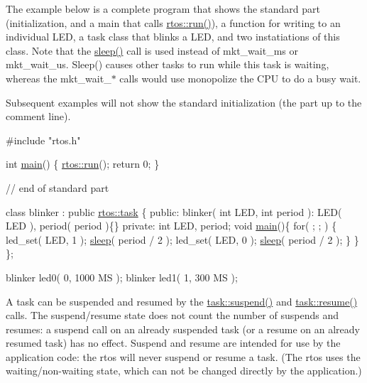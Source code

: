 The example below is a complete program that shows the standard part (initialization, and a main that calls \hyperlink{classrtos_a68de598a7ba3231db123f26187b31730}{rtos\+::run()}), a function for writing to an individual L\+ED, a task class that blinks a L\+ED, and two instatiations of this class. Note that the \hyperlink{classrtos_1_1task__base_a16101726a2ed9744face297f9373b632}{sleep()} call is used instead of mkt\+\_\+wait\+\_\+ms or mkt\+\_\+wait\+\_\+us. Sleep() causes other tasks to run while this task is waiting, whereas the mkt\+\_\+wait\+\_\+$\ast$ calls would use monopolize the C\+PU to do a busy wait.

Subsequent examples will not show the standard initialization (the part up to the comment line).


\begin{DoxyCode}
\textcolor{preprocessor}{#include "rtos.h"}

\textcolor{keywordtype}{int} \hyperlink{classrtos_1_1task__base_a67892c7e1f734e0a91baa5a4fc6dea27}{main}() \{
   \hyperlink{classrtos_a68de598a7ba3231db123f26187b31730}{rtos::run}();
   \textcolor{keywordflow}{return} 0;
\}

\textcolor{comment}{// end of standard part}

\textcolor{keyword}{class }blinker : \textcolor{keyword}{public} \hyperlink{classrtos_1_1task}{rtos::task} \{
\textcolor{keyword}{public}:
   blinker( \textcolor{keywordtype}{int} LED, \textcolor{keywordtype}{int} period ):
      LED( LED ), period( period )\{\}
\textcolor{keyword}{private}:
   \textcolor{keywordtype}{int} LED, period;
   \textcolor{keywordtype}{void} \hyperlink{classrtos_1_1task__base_a67892c7e1f734e0a91baa5a4fc6dea27}{main}()\{
      \textcolor{keywordflow}{for}( ; ; ) \{
         led\_set( LED, 1 );
         \hyperlink{classrtos_1_1task__base_a16101726a2ed9744face297f9373b632}{sleep}( period / 2 );
         led\_set( LED, 0 );
         \hyperlink{classrtos_1_1task__base_a16101726a2ed9744face297f9373b632}{sleep}( period / 2 );
      \}
   \}
\};

blinker led0( 0, 1000 MS );
blinker led1( 1,  300 MS );
\end{DoxyCode}


A task can be suspended and resumed by the \hyperlink{classrtos_1_1task__base_a23f6f33e6e2f3dbe35583c4eb2efe5f8}{task\+::suspend()} and \hyperlink{classrtos_1_1task__base_a3df0d70b06874044937c1ee59820c282}{task\+::resume()} calls. The suspend/resume state does not count the number of suspends and resumes\+: a suspend call on an already suspended task (or a resume on an already resumed task) has no effect. Suspend and resume are intended for use by the application code\+: the rtos will never suspend or resume a task. (The rtos uses the waiting/non-\/waiting state, which can not be changed directly by the application.)

